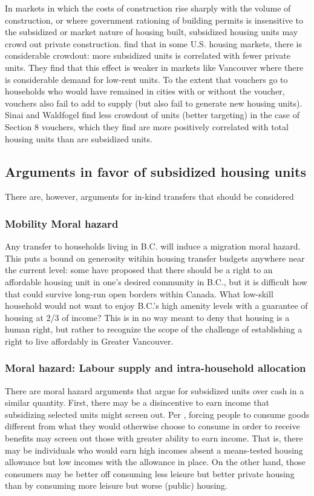 \documentclass[12pt]{article}
\begin{document}
In markets in which the costs of construction rise sharply with the volume of construction, or where government rationing of building permits is insensitive to the subsidized or market nature of housing built, subsidized housing units may crowd out private construction. \textcite{SinaiWaldfogelCrowdout} find that in some U.S. housing markets, there is considerable crowdout: more subsidized units is correlated with fewer private units. They find that this effect is weaker in markets like Vancouver where there is considerable demand for low-rent units. To the extent that vouchers go to households who would have remained in cities with or without the voucher, vouchers also fail to add to supply (but also fail to generate new housing units). Sinai and Waldfogel find less crowdout of units (better targeting) in the case of Section 8 vouchers, which they find are more positively correlated with total housing units than are subsidized units.

\subsection{Arguments in favor of subsidized housing units}

There are, however, arguments for in-kind transfers that should be considered

\subsubsection{Mobility Moral hazard}

Any transfer to households living in B.C. will induce a migration moral hazard. This puts a bound on generosity witihin housing transfer budgets anywhere near the current level: some have proposed that there should be a right to an affordable housing unit in one's desired community in B.C., but it is difficult how that could survive long-run open borders within Canada. What low-skill household would not want to enjoy B.C.'s high amenity levels with a guarantee of housing at 2/3 of income? This is in no way meant to deny that housing is a human right, but rather to recognize the scope of the challenge of establishing a right to live affordably in Greater Vancouver.

\subsubsection{Moral hazard: Labour supply and intra-household allocation}
There are moral hazard arguments that argue for subsidized units over cash in a similar quantity. First, there may be a disincentive to earn income that subsidizing selected units might screen out. Per \textcite{BesleyCoate}, forcing people to consume goods different from what they would otherwise choose to consume in order to receive benefits may screen out those with greater ability to earn income. That is, there may be individuals who would earn high incomes absent a means-tested housing allowance but low incomes with the allowance in place. On the other hand, those consumers may be better off consuming less leisure but better private housing than by consuming more leisure but worse (public) housing.
\end{document}
